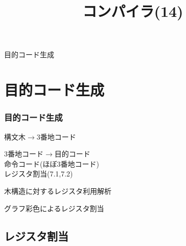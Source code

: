 \documentclass[ckj,dvipdfmx]{beamer}
\title{コンパイラ(14)}
\date{\lecturedate}
\begin{document}
\frame{\titlepage}

\begin{frame}
 \begin{center}
  {\Huge 目的コード生成}
 \end{center}
\end{frame}

\section{目的コード生成}

\begin{frame}
 \frametitle{目的コード生成}

 \begin{list}{}{}
  \item [フロントエンド] 構文木$\rightarrow$3番地コード
  \item [バックエンド] 3番地コード$\rightarrow$目的コード\\
	命令コード(ほぼ3番地コード)\\
	レジスタ割当(7.1,7.2)
	\begin{list}{}{}
	 \item [7.1] 木構造に対するレジスタ利用解析
	 \item [7.2] グラフ彩色によるレジスタ割当
	\end{list}
 \end{list}

\end{frame}

\subsection{レジスタ割当}
\end{document}
